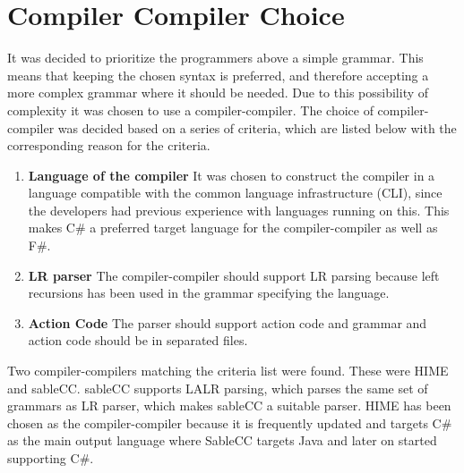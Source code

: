 \section{Compiler Compiler Choice}
\label{sec:compiler_compiler_choice}

It was decided to prioritize the programmers above a simple grammar. This means that keeping the chosen syntax is preferred, and therefore accepting a more complex grammar where it should be needed. Due to this possibility of complexity it was chosen to use a compiler-compiler. The choice of compiler-compiler was decided based on a series of criteria, which are listed below with the corresponding reason for the criteria.

\begin{enumerate}
\item \textbf{Language of the compiler} It was chosen to construct the compiler in a language compatible with the common language infrastructure (CLI), since the developers had previous experience with languages running on this. This makes C\# a preferred target language for the compiler-compiler as well as F\#.

\item \textbf{LR parser} The compiler-compiler should support LR parsing because left recursions has been used in the grammar specifying the language.\\

\item \textbf{Action Code} The parser should support action code and grammar and action code should be in separated files.\\

\end{enumerate}

Two compiler-compilers matching the criteria list were found. These were HIME and sableCC. sableCC supports LALR parsing, which parses the same set of grammars as LR parser, which makes sableCC a suitable parser. HIME has been chosen as the compiler-compiler because it is frequently updated and targets C\# as the main output language where SableCC targets Java and later on started supporting C\#.